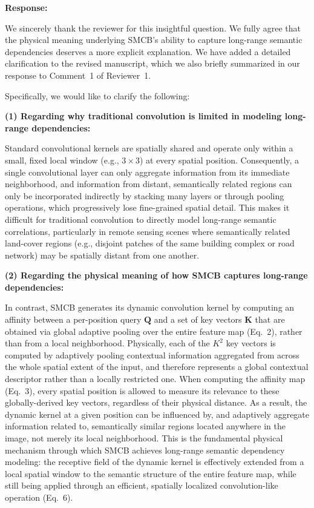 \textbf{Response:}

We sincerely thank the reviewer for this insightful question. We fully agree that the physical meaning underlying SMCB's ability to capture long-range semantic dependencies deserves a more explicit explanation. We have added a detailed clarification to the revised manuscript, which we also briefly summarized in our response to Comment~1 of Reviewer~1.

Specifically, we would like to clarify the following:

\textbf{(1) Regarding why traditional convolution is limited in modeling long-range dependencies:}

Standard convolutional kernels are spatially shared and operate only within a small, fixed local window (e.g., $3\times3$) at every spatial position. Consequently, a single convolutional layer can only aggregate information from its immediate neighborhood, and information from distant, semantically related regions can only be incorporated indirectly by stacking many layers or through pooling operations, which progressively lose fine-grained spatial detail. This makes it difficult for traditional convolution to directly model long-range semantic correlations, particularly in remote sensing scenes where semantically related land-cover regions (e.g., disjoint patches of the same building complex or road network) may be spatially distant from one another.

\textbf{(2) Regarding the physical meaning of how SMCB captures long-range dependencies:}

In contrast, SMCB generates its dynamic convolution kernel by computing an affinity between a per-position query $\mathbf{Q}$ and a set of key vectors $\mathbf{K}$ that are obtained via global adaptive pooling over the entire feature map (Eq.~2), rather than from a local neighborhood. Physically, each of the $K^2$ key vectors is computed by adaptively pooling contextual information aggregated from across the whole spatial extent of the input, and therefore represents a global contextual descriptor rather than a locally restricted one. When computing the affinity map (Eq.~3), every spatial position is allowed to measure its relevance to these globally-derived key vectors, regardless of their physical distance. As a result, the dynamic kernel at a given position can be influenced by, and adaptively aggregate information related to, semantically similar regions located anywhere in the image, not merely its local neighborhood. This is the fundamental physical mechanism through which SMCB achieves long-range semantic dependency modeling: the receptive field of the dynamic kernel is effectively extended from a local spatial window to the semantic structure of the entire feature map, while still being applied through an efficient, spatially localized convolution-like operation (Eq.~6).

